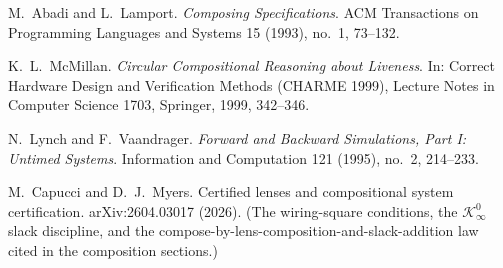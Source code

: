 
M.~Abadi and L.~Lamport.
\emph{Composing Specifications}.
ACM Transactions on Programming Languages and Systems 15 (1993),
no.~1, 73--132.

K.~L.~McMillan.
\emph{Circular Compositional Reasoning about Liveness}.
In: Correct Hardware Design and Verification Methods (CHARME 1999),
Lecture Notes in Computer Science 1703, Springer, 1999, 342--346.

N.~Lynch and F.~Vaandrager.
\emph{Forward and Backward Simulations, Part I: Untimed Systems}.
Information and Computation 121 (1995), no.~2, 214--233.

M.~Capucci and D.~J.~Myers.
Certified lenses and compositional system certification.
arXiv:2604.03017 (2026). (The wiring-square conditions, the
$\mathcal{K}^0_\infty$ slack discipline, and the
compose-by-lens-composition-and-slack-addition law cited in the
composition sections.)

